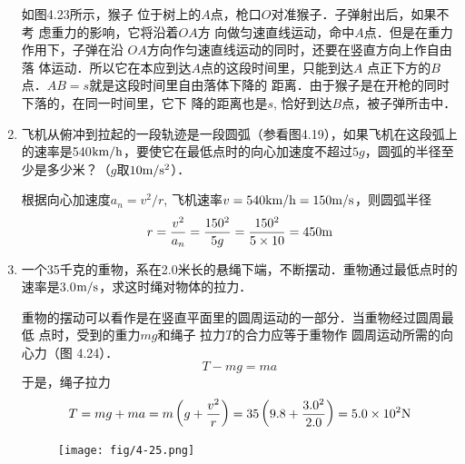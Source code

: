 \begin{enumerate}
\begin{solution}
如图4.23所示，猴子
位于树上的$A$点，枪口$O$对准猴子．子弹射出后，如果不考
虑重力的影响，它将沿着$OA$方
向做匀速直线运动，命中$A$点．但是在重力作用下，子弹在沿
$OA$方向作匀速直线运动的同时，还要在竖直方向上作自由落
体运动．所以它在本应到达$A$点的这段时间里，只能到达$A$
点正下方的$B$点．$AB=s$就是这段时间里自由落体下降的
距离．由于猴子是在开枪的同时下落的，在同一时间里，它下
降的距离也是$s$, 恰好到达$B$点，被子弹所击中．
\end{solution}
\item  飞机从俯冲到拉起的一段轨迹是一段圆弧（参看图4.19），如果飞机在这段弧上的速率是540$\text{km}/\text{h}$，要使它在最低点时的向心加速度不超过$5g$，圆弧的半径至少是多少米？（$g$取$10\text{m}/\text{s}^2$）．

\begin{solution}
    根据向心加速度$a_n=v^2/r$, 飞机速率$v=540\text{km}/\text{h}=150\text{m}/\text{s}$，则圆弧半径
    \[r=\frac{v^2}{a_n}=\frac{150^2}{5g}=\frac{150^2}{5\times 10}=450{\rm m}\]
\end{solution}
\item  一个35千克的重物，系在2.0米长的悬绳下端，不断摆动．重物通过最低点时的速率是3.0$\text{m}/\text{s}$，求这时绳对物体的拉力．

\begin{solution}
    重物的摆动可以看作是在竖直平面里的圆周运动的一部分．当重物经过圆周最低
    点时，受到的重力$mg$和绳子
    拉力$T$的合力应等于重物作
    圆周运动所需的向心力（图
    4.24）．
\[T-mg=ma\]
于是，绳子拉力
\[T=mg+ma=m\left(g+\frac{v^2}{r}\right)=35\left(9.8+\frac{3.0^2}{2.0}\right)=5.0\times 10^2{\rm N}\]
\end{solution}

\begin{figure}[htp]\centering
    \begin{minipage}[t]{0.48\textwidth}
    \centering
{}
    \caption{}
    \end{minipage}
    \begin{minipage}[t]{0.48\textwidth}
    \centering
    \texttt{[image: fig/4-25.png]}
    \caption{}
    \end{minipage}
    \end{figure}


\end{enumerate}
